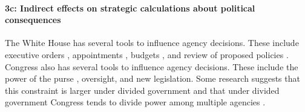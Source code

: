 \paragraph{3c: Indirect effects on strategic calculations about political consequences}


The White House has several tools to influence agency decisions. %
These include executive orders \citep{Mayer1999}, appointments \citep{Doherty2014,Lewis2008,Wood1988}, budgets \citep{Whittington2003}, and review of proposed policies \citep{Haeder2015, Acs2013}. Congress also has several tools to influence agency decisions. These include the power of the purse \citep{Fenno1986,Bolton2015}, oversight, and new legislation. Some research suggests that this constraint is larger under divided government \citep{Yackee2009RegGov} %
and that under divided government Congress tends to divide power among multiple agencies \citep{Farhang2016}.

